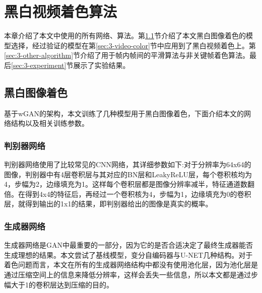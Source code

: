 \chapter{黑白视频着色算法}
\label{cha:3-video-color}

  本章介绍了本文中使用的所有网络、算法。第\ref{sec:3-image-color}节介绍了本文黑白图像着色的模型选择，经过验证的模型在第\ref{sec:3-video-color}节中应用到了黑白视频着色上。第\ref{sec:3-other-algorithm}节介绍了用于帧内帧间的平滑算法与非关键帧着色算法。最后\ref{sec:3-experiment}节展示了实验结果。

\section{黑白图像着色}
\label{sec:3-image-color}

  基于wGAN的架构，本文训练了几种模型用于黑白图像着色，下面介绍本文的网络结构以及相关训练参数。

\subsection{判别器网络}
\label{sec:3-image-dnet}
  
  判别器网络使用了比较常见的CNN网络，其详细参数如下:对于分辨率为64x64的图像，判别器中有4层卷积层与其对应的BN层和LeakyReLU层，每个卷积核均为4，步幅为2，边缘填充为1。这样每个卷积层都是图像分辨率减半，特征通道数翻倍。在得到4x4的特征后，再经过一个卷积核为4，步幅为1，边缘填充为0的卷积层，就得到输出的1x1的结果，即判别器给出的图像是真实的概率。
  
\subsection{生成器网络}
\label{sec:3-image-gnet}

  生成器网络是GAN中最重要的一部分，因为它的是否合适决定了最终生成器能否生成理想的结果。本文尝试了基线模型，变分自编码器与U-NET几种结构。对于着色问题而言，本文在所有的生成器网络结构中都没有使用池化层，因为池化层是通过压缩空间上的信息来降低分辨率，这样会丢失一些信息，所以本文都是通过步幅大于1的卷积层达到压缩的目的。


